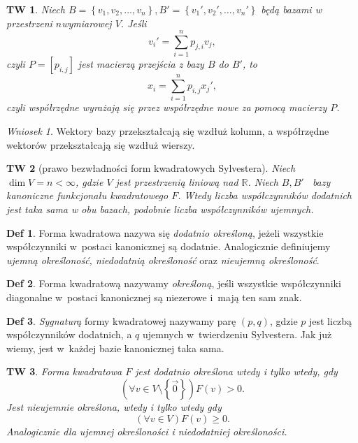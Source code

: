 \documentclass[a4paper, 12pt]{mwart}
\theoremstyle{definition}
\newtheorem{definicja}{Def}[section]
\theoremstyle{plain}
\newtheorem{twierdzenie}{TW}[section]
\theoremstyle{remark}
\newtheorem{wniosek}{Wniosek}[section]
\begin{document}
\begin{twierdzenie}
	Niech $B = \left\{v_1, v_2, \ldots, v_n\right\}, B' = \left\{v_1', v_2', \ldots, v_n'\right\}$ będą bazami w przestrzeni $n$\ppauza wymiarowej $V$. Jeśli
	\begin{equation}
		v_i' = \sum_{i = 1}^n p_{j, i}v_j,
	\end{equation}
	czyli $P = [p_{i, j}]$ jest macierzą przejścia z bazy $B$ do $B'$, to
	\begin{equation}
		x_i = \sum_{i = 1}^n p_{i, j}x_j',
	\end{equation}
	czyli współrzędne wyrażają się przez współrzędne nowe za pomocą macierzy $P$.
\end{twierdzenie}
\begin{wniosek}
	Wektory bazy przekształcają się wzdłuż kolumn, a współrzędne wektorów przekształcają się wzdłuż wierszy.
\end{wniosek}
\begin{twierdzenie}[prawo bezwładności form kwadratowych Sylvestera]
	Niech $\dim V = n < \infty$, gdzie $V$ jest przestrzenią liniową nad $\mathbb{R}$. Niech $B, B'$ \ppauza\ bazy kanoniczne funkcjonału kwadratowego $F$. Wtedy liczba współczynników dodatnich jest taka sama w obu bazach, podobnie liczba współczynników ujemnych.
\end{twierdzenie}
\begin{definicja}
	Forma kwadratowa nazywa się \emph{dodatnio określoną}, jeżeli wszystkie współczynniki w~postaci kanonicznej są dodatnie. Analogicznie definiujemy \emph{ujemną określoność, niedodatnią określoność} oraz \emph{nieujemną określoność}.
\end{definicja}
\begin{definicja}
	Forma kwadratową nazywamy \emph{określoną}, jeśli wszystkie współczynniki diagonalne w~postaci kanonicznej są niezerowe i~mają ten sam znak.
\end{definicja}
\begin{definicja}
	\emph{Sygnaturą} formy kwadratowej nazywamy parę $(p, q)$, gdzie $p$ jest liczbą współczynników dodatnich, a $q$ ujemnych w~twierdzeniu Sylvestera. Jak już wiemy, jest w~każdej bazie kanonicznej taka sama.
\end{definicja}
\begin{twierdzenie}
	Forma kwadratowa $F$ jest dodatnio określona wtedy i tylko wtedy, gdy
	\begin{equation}
		\left(\forall v\in V\setminus\left\{\vec 0\right\}\right) F(v) > 0.
	\end{equation}
	Jest nieujemnie określona, wtedy i tylko wtedy gdy
	\begin{equation}
		\left(\forall v\in V\right) F(v) \geq 0.
	\end{equation}
	Analogicznie dla ujemnej określoności i niedodatniej określoności.
\end{twierdzenie}
\end{document}

